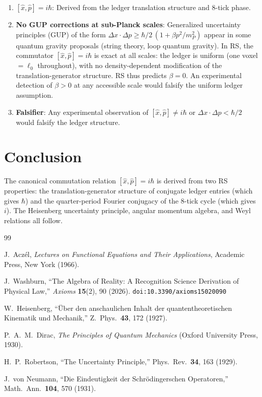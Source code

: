 \documentclass[12pt,a4paper]{article}
\theoremstyle{definition}
\theoremstyle{remark}
\begin{document}
\begin{enumerate}
  \item \textbf{$[\hat{x}, \hat{p}] = i\hbar$}: Derived from
  the ledger translation structure and 8-tick phase.

  \item \textbf{No GUP corrections at sub-Planck scales}:
  Generalized uncertainty principles (GUP) of the form
  $\Delta x \cdot \Delta p \geq \hbar/2\,(1 + \beta p^2/m_P^2)$
  appear in some quantum gravity proposals (string theory,
  loop quantum gravity).  In RS, the commutator
  $[\hat{x}, \hat{p}] = i\hbar$ is exact at all scales: the
  ledger is uniform (one voxel $= \ell_0$ throughout), with no
  density-dependent modification of the translation-generator
  structure.  RS thus predicts $\beta = 0$.  An experimental
  detection of $\beta > 0$ at any accessible scale would falsify
  the uniform ledger assumption.

  \item \textbf{Falsifier}: Any experimental observation of
  $[\hat{x}, \hat{p}] \neq i\hbar$ or $\Delta x \cdot \Delta p
  < \hbar/2$ would falsify the ledger structure.
\end{enumerate}

\section{Conclusion}
\label{sec:conclusion}

The canonical commutation relation $[\hat{x}, \hat{p}] = i\hbar$
is derived from two RS properties: the translation-generator
structure of conjugate ledger entries (which gives $\hbar$) and
the quarter-period Fourier conjugacy of the 8-tick cycle (which
gives $i$).  The Heisenberg uncertainty principle, angular
momentum algebra, and Weyl relations all follow.

\begin{thebibliography}{99}

J.~Acz\'el, \emph{Lectures on Functional Equations and Their Applications},
Academic Press, New York (1966).

J.~Washburn, ``The Algebra of Reality: A Recognition Science Derivation
of Physical Law,'' \emph{Axioms} \textbf{15}(2), 90 (2026).
\texttt{doi:10.3390/axioms15020090}

W.~Heisenberg, ``\"Uber den anschaulichen Inhalt der
quantentheoretischen Kinematik und Mechanik,'' Z.\ Phys.\
\textbf{43}, 172 (1927).

P.~A.~M.~Dirac, \textit{The Principles of Quantum Mechanics}
(Oxford University Press, 1930).

H.~P.~Robertson, ``The Uncertainty Principle,''
Phys.\ Rev.\ \textbf{34}, 163 (1929).

J.~von Neumann, ``Die Eindeutigkeit der Schr\"odingerschen
Operatoren,'' Math.\ Ann.\ \textbf{104}, 570 (1931).

\end{thebibliography}
\end{document}
